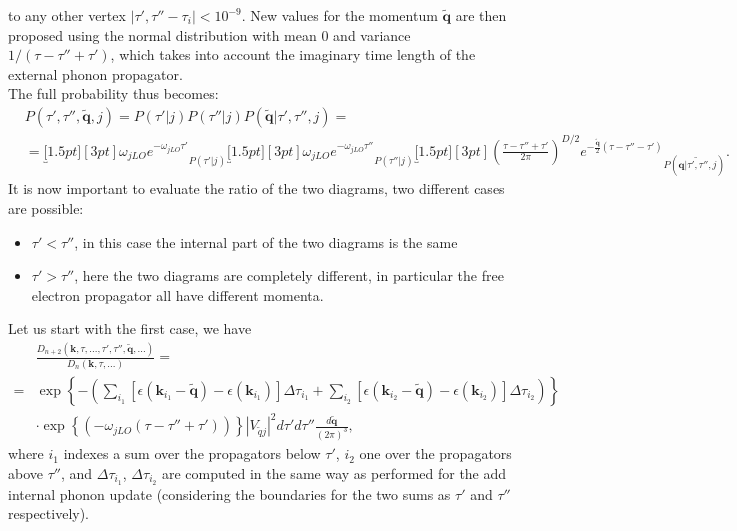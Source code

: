 to any other vertex $|\tau',\tau''-\tau_i|<10^{-9}$. New values for the momentum $\tilde{\mathbf{q}}$ are then proposed using the normal distribution 
with mean $0$ and variance $1/(\tau -\tau''+\tau')$, which takes into account the imaginary time length of the external phonon propagator.\\
The full probability thus becomes:
\begin{equation}
\begin{split}
    &P(\tau',\tau'',\tilde{\mathbf{q}},j)=P(\tau'|j)P(\tau''|j)P(\tilde{\mathbf{q}}|\tau',\tau'',j)=\\
    &=\underbracket[1.5pt][3pt]{\omega_{jLO}e^{-\omega_{jLO}\tau'}}_{P(\tau'|j)}\underbracket[1.5pt][3pt]{\omega_{jLO}e^{-\omega_{jLO}\tau''}}_{P(\tau''|j)}
    \underbracket[1.5pt][3pt]{\left(\frac{\tau-\tau''+\tau'}{2\pi}\right)^{D/2}e^{-\frac{\tilde{\mathbf{q}}}{2}(\tau-\tau''-\tau')}}_{P(\tilde{\mathbf{q}|\tau',\tau'',j})}.
\end{split}
\end{equation}
It is now important to evaluate the ratio of the two diagrams, two different cases are possible:
\begin{itemize}
    \item $\tau'<\tau''$, in this case the internal part of the two diagrams is the same
    \item $\tau'>\tau''$, here the two diagrams are completely different, in particular the free electron propagator all have different momenta.
\end{itemize}
Let us start with the first case, we have
\begin{equation}
\begin{split}
    &\frac{D_{n+2}(\mathbf{k},\tau,...,\tau',\tau'',\tilde{\mathbf{q}},...)}{D_n(\mathbf{k},\tau,...)}=\\
    =&\exp\left\{-\left(\sum_{i_1}\left[\epsilon(\mathbf{k}_{i_1}-\tilde{\mathbf{q}})-\epsilon(\mathbf{k}_{i_1})\right]\Delta\tau_{i_1}+\sum_{i_2}\left[\epsilon(\mathbf{k}_{i_2}-\tilde{\mathbf{q}})-\epsilon(\mathbf{k}_{i_2})\right]\Delta\tau_{i_2}\right)\right\}\\
    &\cdot\exp{\left\{\left(-\omega_{jLO}(\tau-\tau''+\tau')\right)\right\}}|V_{\tilde{q}j}|^2d\tau'd\tau''\frac{d\tilde{\mathbf{q}}}{(2\pi)^3},
\end{split}
\end{equation}
where $i_1$ indexes a sum over the propagators below $\tau'$, $i_2$ one over the propagators above $\tau''$, and $\Delta\tau_{i_1}$, $\Delta\tau_{i_2}$ 
are computed in the same way as performed for the add internal phonon update (considering the boundaries for the two sums as $\tau'$ and $\tau''$ respectively).\\
